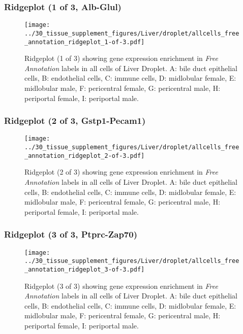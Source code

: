 \subsubsection{Ridgeplot (1 of 3, Alb-Glul)}
\begin{figure}[h]
\centering
\texttt{[image: ../30\_tissue\_supplement\_figures/Liver/droplet/allcells\_free\_annotation\_ridgeplot\_1-of-3.pdf]}

\caption{ Ridgeplot (1 of 3)  showing gene expression enrichment in \emph{Free Annotation} labels in all cells of Liver Droplet. A: bile duct epithelial cells, B: endothelial cells, C: immune cells, D: midlobular female, E: midlobular male, F: pericentral female, G: pericentral male, H: periportal female, I: periportal male.}
\end{figure}


\clearpage

\subsubsection{Ridgeplot (2 of 3, Gstp1-Pecam1)}
\begin{figure}[h]
\centering
\texttt{[image: ../30\_tissue\_supplement\_figures/Liver/droplet/allcells\_free\_annotation\_ridgeplot\_2-of-3.pdf]}

\caption{ Ridgeplot (2 of 3)  showing gene expression enrichment in \emph{Free Annotation} labels in all cells of Liver Droplet. A: bile duct epithelial cells, B: endothelial cells, C: immune cells, D: midlobular female, E: midlobular male, F: pericentral female, G: pericentral male, H: periportal female, I: periportal male.}
\end{figure}


\clearpage

\subsubsection{Ridgeplot (3 of 3, Ptprc-Zap70)}
\begin{figure}[h]
\centering
\texttt{[image: ../30\_tissue\_supplement\_figures/Liver/droplet/allcells\_free\_annotation\_ridgeplot\_3-of-3.pdf]}

\caption{ Ridgeplot (3 of 3)  showing gene expression enrichment in \emph{Free Annotation} labels in all cells of Liver Droplet. A: bile duct epithelial cells, B: endothelial cells, C: immune cells, D: midlobular female, E: midlobular male, F: pericentral female, G: pericentral male, H: periportal female, I: periportal male.}
\end{figure}


